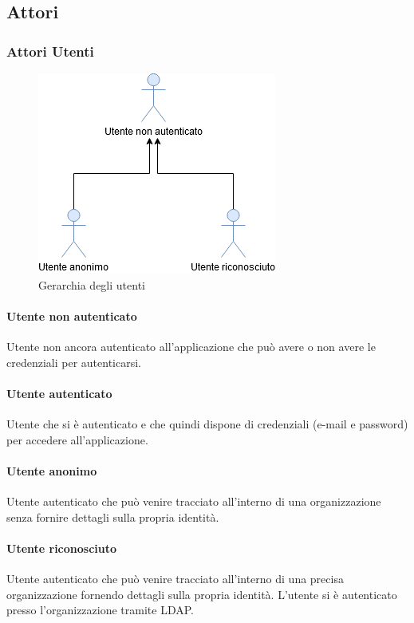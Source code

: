 \subsection{Attori}
\subsubsection{Attori Utenti}

\begin{figure}[h]
  \caption{Gerarchia degli utenti}
  \centering
    \includegraphics[scale=0.6]{sezioni/UseCase/Immagini/Utenti.png}
\end{figure}

\paragraph{Utente non autenticato}
Utente non ancora autenticato all'applicazione che può avere o non avere le credenziali per autenticarsi.
\paragraph{Utente autenticato}
Utente che si è autenticato e che quindi dispone di credenziali (e-mail e password) per accedere all'applicazione.
\paragraph{Utente anonimo}
Utente autenticato che può venire tracciato all'interno di una organizzazione senza fornire dettagli sulla propria identità.
\paragraph{Utente riconosciuto}
Utente autenticato che può venire tracciato all'interno di una precisa organizzazione fornendo dettagli sulla propria identità.
L'utente si è autenticato presso l'organizzazione tramite LDAP.




